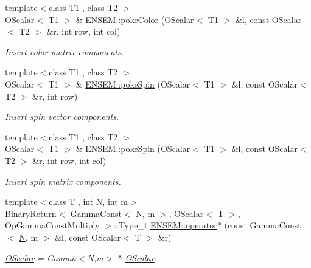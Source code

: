 \begin{DoxyCompactItemize}
{\footnotesize template$<$class T1 , class T2 $>$ }\\O\+Scalar$<$ T1 $>$ \& \mbox{\hyperlink{group__obsscalar_ga9271cf018f5c0e5f74f6b065b68f91b9}{E\+N\+S\+E\+M\+::poke\+Color}} (O\+Scalar$<$ T1 $>$ \&l, const O\+Scalar$<$ T2 $>$ \&r, int row, int col)
\begin{DoxyCompactList}\small\item\em Insert color matrix components. \end{DoxyCompactList}\item 
{\footnotesize template$<$class T1 , class T2 $>$ }\\O\+Scalar$<$ T1 $>$ \& \mbox{\hyperlink{group__obsscalar_ga4ad5af637811a273152545d97b009c62}{E\+N\+S\+E\+M\+::poke\+Spin}} (O\+Scalar$<$ T1 $>$ \&l, const O\+Scalar$<$ T2 $>$ \&r, int row)
\begin{DoxyCompactList}\small\item\em Insert spin vector components. \end{DoxyCompactList}\item 
{\footnotesize template$<$class T1 , class T2 $>$ }\\O\+Scalar$<$ T1 $>$ \& \mbox{\hyperlink{group__obsscalar_gadabf69e63453311d92faee77643c2b7a}{E\+N\+S\+E\+M\+::poke\+Spin}} (O\+Scalar$<$ T1 $>$ \&l, const O\+Scalar$<$ T2 $>$ \&r, int row, int col)
\begin{DoxyCompactList}\small\item\em Insert spin matrix components. \end{DoxyCompactList}\item 
{\footnotesize template$<$class T , int N, int m$>$ }\\\mbox{\hyperlink{structBinaryReturn}{Binary\+Return}}$<$ Gamma\+Const$<$ \mbox{\hyperlink{adat__devel_2lib_2hadron_2operator__name__util_8cc_a7722c8ecbb62d99aee7ce68b1752f337}{N}}, m $>$, O\+Scalar$<$ T $>$, Op\+Gamma\+Const\+Multiply $>$\+::Type\+\_\+t \mbox{\hyperlink{group__obsscalar_ga3db0be55f47b788fa0f005d8e7bcfbac}{E\+N\+S\+E\+M\+::operator$\ast$}} (const Gamma\+Const$<$ \mbox{\hyperlink{adat__devel_2lib_2hadron_2operator__name__util_8cc_a7722c8ecbb62d99aee7ce68b1752f337}{N}}, m $>$ \&l, const O\+Scalar$<$ T $>$ \&r)
\begin{DoxyCompactList}\small\item\em \mbox{\hyperlink{classENSEM_1_1OScalar}{O\+Scalar}} = Gamma$<$\+N,m$>$ $\ast$ \mbox{\hyperlink{classENSEM_1_1OScalar}{O\+Scalar}}. \end{DoxyCompactList}\item 

\end{DoxyCompactItemize}

